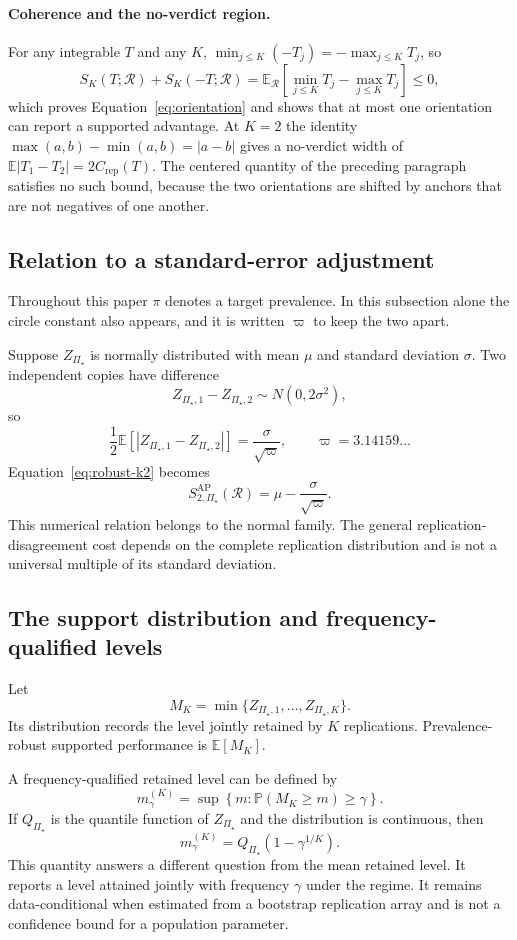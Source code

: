 \documentclass[11pt]{article}
\newcommand{\Regime}{\mathcal{R}}
\newcommand{\PSet}{\Pi_\star}
\newcommand{\E}{\mathbb{E}}
\newcommand{\Prb}{\mathbb{P}}
\theoremstyle{remark}
\begin{document}
\paragraph{Coherence and the no-verdict region.}
For any integrable $T$ and any $K$, $\min_{j\leq K}(-T_j)=-\max_{j\leq K}T_j$, so
\[
S_K(T;\Regime)+S_K(-T;\Regime)
=
\E_{\Regime}
\left[
\min_{j\leq K}T_j-\max_{j\leq K}T_j
\right]
\leq0,
\]
which proves Equation~\eqref{eq:orientation} and shows that at most one orientation can report a supported advantage. At $K=2$ the identity $\max(a,b)-\min(a,b)=|a-b|$ gives a no-verdict width of $\E|T_1-T_2|=2C_{\mathrm{rep}}(T)$. The centered quantity of the preceding paragraph satisfies no such bound, because the two orientations are shifted by anchors that are not negatives of one another.

\subsection{Relation to a standard-error adjustment}

Throughout this paper $\pi$ denotes a target prevalence. In this subsection alone the circle constant also appears, and it is written $\varpi$ to keep the two apart.

Suppose $Z_{\PSet}$ is normally distributed with mean $\mu$ and standard deviation $\sigma$. Two independent copies have difference
\[
Z_{\PSet,1}-Z_{\PSet,2}
\sim
N(0,2\sigma^2),
\]
so
\[
\frac12
\E
\left[
|Z_{\PSet,1}-Z_{\PSet,2}|
\right]
=
\frac{\sigma}{\sqrt{\varpi}},
\qquad
\varpi=3.14159\ldots
\]
Equation~\eqref{eq:robust-k2} becomes
\[
S_{2,\PSet}^{\mathrm{AP}}(\Regime)
=
\mu-\frac{\sigma}{\sqrt{\varpi}}.
\]
This numerical relation belongs to the normal family. The general replication-disagreement cost depends on the complete replication distribution and is not a universal multiple of its standard deviation.

\subsection{The support distribution and frequency-qualified levels}

Let
\[
M_K
=
\min\{Z_{\PSet,1},\ldots,Z_{\PSet,K}\}.
\]
Its distribution records the level jointly retained by $K$ replications. Prevalence-robust supported performance is $\E[M_K]$.

A frequency-qualified retained level can be defined by
\[
m_\gamma^{(K)}
=
\sup
\left\{
m:
\Prb(M_K\geq m)\geq\gamma
\right\}.
\]
If $Q_{\PSet}$ is the quantile function of $Z_{\PSet}$ and the distribution is continuous, then
\begin{equation}
m_\gamma^{(K)}
=
Q_{\PSet}\left(1-\gamma^{1/K}\right).
\label{eq:frequency-level}
\end{equation}
This quantity answers a different question from the mean retained level. It reports a level attained jointly with frequency $\gamma$ under the regime. It remains data-conditional when estimated from a bootstrap replication array and is not a confidence bound for a population parameter.
\end{document}
